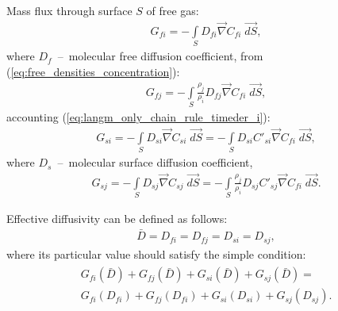 \documentclass[a4paper,14pt,english]{extreport}
\begin{document}
Mass flux through surface $S$ of free gas:
\begin{eqnarray}
	\label{eq:flux_free_i}
	G_{fi} = - \int \limits_{S} D_{fi} \vec{\nabla}C_{fi} \; \vec{dS},
\end{eqnarray}
where $D_{f}$~--~molecular free diffusion coefficient, from (\ref{eq:free_densities_concentration}):
\begin{eqnarray}
	\label{eq:flux_free_j}
	G_{fj} = -\int \limits_{S} \frac{\rho_j}{\rho_i} D_{fj} \vec{\nabla}C_{fi} \; \vec{dS},
\end{eqnarray}
accounting (\ref{eq:langm_only_chain_rule_timeder_i}):
\begin{eqnarray}
	\label{eq:flux_surface_i}
	G_{si} = - \int \limits_{S} D_{si} \vec\nabla C_{si} \; \vec{dS} = - \int \limits_{S} D_{si}  C'_{si}\vec\nabla C_{fi} \; \vec{dS},
\end{eqnarray}
where $D_{s}$~--~molecular surface diffusion coefficient,
\begin{eqnarray}
	\label{eq:flux_surface_j}
	G_{sj} = - \int \limits_{S} D_{sj} \vec\nabla C_{sj} \; \vec{dS} = - \int \limits_{S} \frac{\rho_j}{\rho_i}D_{sj}  C'_{sj}\vec\nabla C_{fi} \; \vec{dS}.
\end{eqnarray}

Effective diffusivity can be defined as follows:
\begin{eqnarray}
	\label{eq:effective_diffusivity}
\bar{D} = D_{fi} =D_{fj} =D_{si} =D_{sj},
\end{eqnarray}
where its particular value should satisfy the simple condition:
\begin{eqnarray}
	\begin{gathered}
	\label{eq:effective_diffusivity_condition}
	G_{fi}\left(\bar{D} \right) + G_{fj}\left(\bar{D} \right)  + G_{si}\left(\bar{D} \right)  + G_{sj}\left(\bar{D} \right) = \\
	G_{fi}\left(D_{fi} \right) + G_{fj}\left(D_{fi} \right)  + G_{si}\left(D_{si}\right)  + G_{sj}\left(D_{sj} \right).
	\end{gathered}
\end{eqnarray}






 
\end{document}

